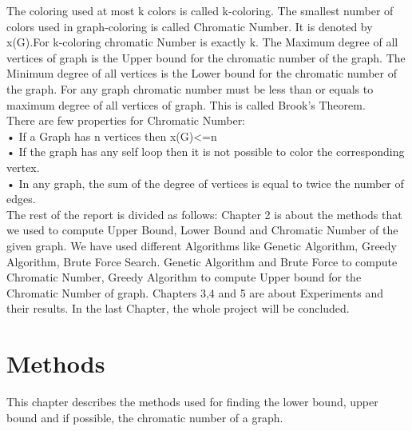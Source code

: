 \documentclass[a4paper]{report}
\begin{document}
	The coloring used at most k colors is called k-coloring. The smallest number of colors used in graph-coloring is called Chromatic Number. It is denoted by x(G).For k-coloring chromatic Number is exactly k. The Maximum degree of all vertices of graph is the Upper bound for the chromatic number of the graph. The Minimum degree of all vertices is the Lower bound for the chromatic number of the graph. For any graph chromatic number must be less than or equals to maximum degree of all vertices of graph. This is called Brook's Theorem. 
\\
	
	
	There are few properties for Chromatic Number:
\\
	•	If a Graph has n vertices then x(G)<=n
\\
	•	If the graph has any self loop then it is not possible to color the corresponding vertex.
\\
	•	In any graph, the sum of the degree of vertices is equal to twice the number of edges.
\\
	
	
	The rest of the report is divided as follows: Chapter 2 is about the methods that we used to compute  Upper Bound, Lower Bound and Chromatic Number of the given graph. We have used different Algorithms like Genetic Algorithm, Greedy Algorithm, Brute  Force Search. Genetic Algorithm and Brute Force  to compute Chromatic Number, Greedy Algorithm to compute Upper bound for the Chromatic Number of graph.  Chapters 3,4 and 5 are about Experiments and their results. In the last Chapter, the whole project will be concluded.
\\
	

	
	\chapter{Methods}
	This chapter describes the methods used for finding the lower bound, upper bound and if possible, the chromatic number of a graph. 
\end{document}
